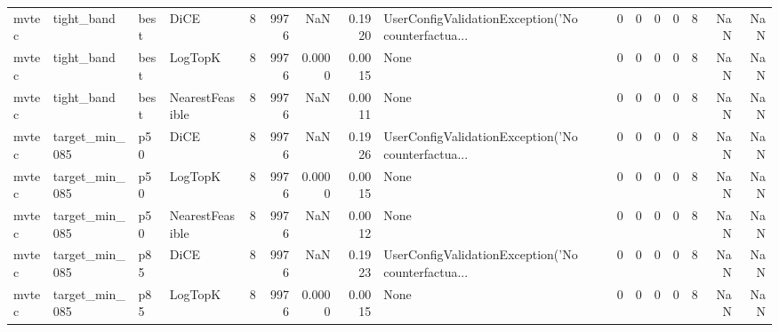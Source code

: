 \begin{tabular}{llllrrrrlrrrrrrr}
  mvtec &           tight\_band &   best &            DiCE &            8 &                 9976 &                      NaN &      0.1920 & UserConfigValidationException('No counterfactua... &      0 &            0 &        0 &              0 &          8 &                NaN &            NaN \\
  mvtec &           tight\_band &   best &         LogTopK &            8 &                 9976 &                   0.0000 &      0.0015 &                                               None &      0 &            0 &        0 &              0 &          8 &                NaN &            NaN \\
  mvtec &           tight\_band &   best & NearestFeasible &            8 &                 9976 &                      NaN &      0.0011 &                                               None &      0 &            0 &        0 &              0 &          8 &                NaN &            NaN \\
  mvtec &       target\_min\_085 &    p50 &            DiCE &            8 &                 9976 &                      NaN &      0.1926 & UserConfigValidationException('No counterfactua... &      0 &            0 &        0 &              0 &          8 &                NaN &            NaN \\
  mvtec &       target\_min\_085 &    p50 &         LogTopK &            8 &                 9976 &                   0.0000 &      0.0015 &                                               None &      0 &            0 &        0 &              0 &          8 &                NaN &            NaN \\
  mvtec &       target\_min\_085 &    p50 & NearestFeasible &            8 &                 9976 &                      NaN &      0.0012 &                                               None &      0 &            0 &        0 &              0 &          8 &                NaN &            NaN \\
  mvtec &       target\_min\_085 &    p85 &            DiCE &            8 &                 9976 &                      NaN &      0.1923 & UserConfigValidationException('No counterfactua... &      0 &            0 &        0 &              0 &          8 &                NaN &            NaN \\
  mvtec &       target\_min\_085 &    p85 &         LogTopK &            8 &                 9976 &                   0.0000 &      0.0015 &                                               None &      0 &            0 &        0 &              0 &          8 &                NaN &            NaN \\

\end{tabular}
